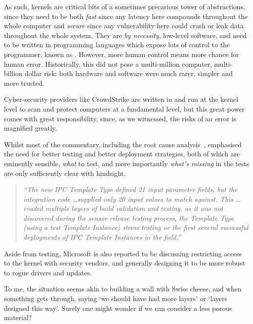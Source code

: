 As such, kernels are critical bits of a sometimes precarious tower of
abstractions, since they need to be both \emph{fast} \textemdash{} since any
latency here compounds throughout the whole computer \textemdash{} and
\emph{secure} \textemdash{} since any vulnerability here could crash or leak
data throughout the whole system. They are \emph{by necessity}, low-level
software, and need to be written in programming languages which expose lots of
control to the programmer, known as .
However, more human control means more chance for human error. Historically,
this did not pose a multi-million computer, multi-billion dollar risk: both
hardware and software were much rarer, simpler and more trusted.

Cyber-security providers like CrowdStrike are written in  and run at the kernel level to scan and
protect computers at a fundamental level, but this great power comes with great
responsibility, since, as we witnessed, the risks of an error is magnified
greatly.

Whilst most of the commentary, including the root cause
analysis~, emphasised the need for better testing
and better deployment strategies, both of which are eminently sensible,
\emph{what} to test, and more importantly \emph{what's missing} in the tests
are only sufficiently clear with hindsight.

\begin{quote}
\emph{%
``The new IPC Template Type defined 21 input parameter fields, but the
integration code \ldots supplied only 20 input values to match against. This
\ldots evaded multiple layers of build validation and testing, as it was not
discovered during the sensor release testing process, the Template Type (using
a test Template Instance) stress testing or the first several successful
deployments of IPC Template Instances in the field.''
}
\end{quote}

Aside from testing, Microsoft is also reported to be discussing restricting
access to the kernel with security vendors, and generally designing it to be
more robust to rogue drivers and updates.~

To me, the situation seems akin to building a wall with Swiss cheese, and when
something gets through, saying `we should have had more layers' or `layers
designed this way'. Surely one might wonder if we can consider a less porous
material?

